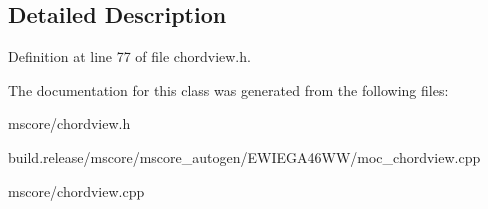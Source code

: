 \subsection{Detailed Description}


Definition at line 77 of file chordview.\+h.



The documentation for this class was generated from the following files\+:\begin{DoxyCompactItemize}
\item 
mscore/chordview.\+h\item 
build.\+release/mscore/mscore\+\_\+autogen/\+E\+W\+I\+E\+G\+A46\+W\+W/moc\+\_\+chordview.\+cpp\item 
mscore/chordview.\+cpp\end{DoxyCompactItemize}

